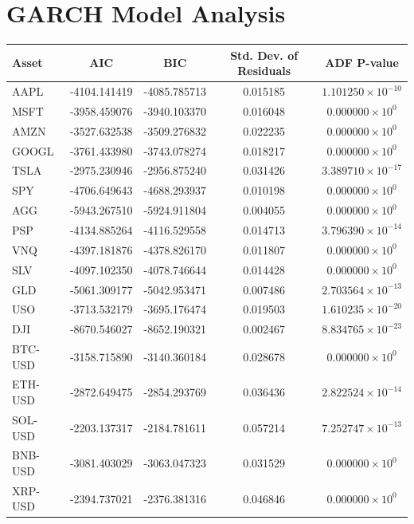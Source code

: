 \documentclass{ledger}
\begin{document}
\pagebreak
\setcounter{section}{1}
\section{GARCH Model Analysis}\label{appendix:garch_comparison}

\begin{table}[h]
\centering
\begin{tabular}{|l|c|c|c|c|}
\hline
\textbf{Asset} & \textbf{AIC} & \textbf{BIC} & \textbf{Std. Dev. of Residuals} & \textbf{ADF P-value} \\
\hline
AAPL & -4104.141419 & -4085.785713 & 0.015185 & $1.101250 \times 10^{-10}$ \\
MSFT & -3958.459076 & -3940.103370 & 0.016048 & $0.000000 \times 10^{0}$ \\
AMZN & -3527.632538 & -3509.276832 & 0.022235 & $0.000000 \times 10^{0}$ \\
GOOGL & -3761.433980 & -3743.078274 & 0.018217 & $0.000000 \times 10^{0}$ \\
TSLA & -2975.230946 & -2956.875240 & 0.031426 & $3.389710 \times 10^{-17}$ \\
SPY & -4706.649643 & -4688.293937 & 0.010198 & $0.000000 \times 10^{0}$ \\
AGG & -5943.267510 & -5924.911804 & 0.004055 & $0.000000 \times 10^{0}$ \\
PSP & -4134.885264 & -4116.529558 & 0.014713 & $3.796390 \times 10^{-14}$ \\
VNQ & -4397.181876 & -4378.826170 & 0.011807 & $0.000000 \times 10^{0}$ \\
SLV & -4097.102350 & -4078.746644 & 0.014428 & $0.000000 \times 10^{0}$ \\
GLD & -5061.309177 & -5042.953471 & 0.007486 & $2.703564 \times 10^{-13}$ \\
USO & -3713.532179 & -3695.176474 & 0.019503 & $1.610235 \times 10^{-20}$ \\
DJI & -8670.546027 & -8652.190321 & 0.002467 & $8.834765 \times 10^{-23}$ \\
BTC-USD & -3158.715890 & -3140.360184 & 0.028678 & $0.000000 \times 10^{0}$ \\
ETH-USD & -2872.649475 & -2854.293769 & 0.036436 & $2.822524 \times 10^{-14}$ \\
SOL-USD & -2203.137317 & -2184.781611 & 0.057214 & $7.252747 \times 10^{-13}$ \\
BNB-USD & -3081.403029 & -3063.047323 & 0.031529 & $0.000000 \times 10^{0}$ \\
XRP-USD & -2394.737021 & -2376.381316 & 0.046846 & $0.000000 \times 10^{0}$ \\

\end{tabular}
\end{table}
\end{document}
